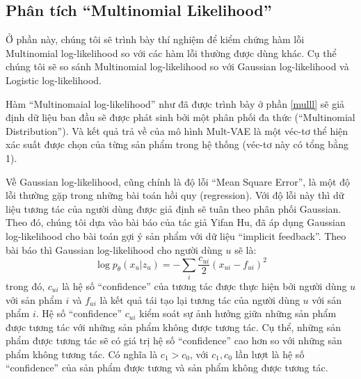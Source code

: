     
    
    \subsection{Phân tích ``Multinomial Likelihood''}

    Ở phần này, chúng tôi sẽ trình bày thí nghiệm để kiểm chứng hàm lỗi Multinomial log-likelihood so với các hàm lỗi thường được dùng khác.
    Cụ thể chúng tôi sẽ so sánh Multinomial log-likelihood so với Gaussian log-likelihood và Logistic log-likelihood. 


    Hàm ``Multinomaial log-likelihood'' như đã được trình bày ở phần \ref{mulll} sẽ giả định dữ liệu ban đầu sẽ được phát sinh bởi một phân phối đa thức (``Multinomial Distribution'').
    Và kết quả trả về của mô hình Mult-VAE là một véc-tơ thể hiện xác suất được chọn của từng sản phẩm trong hệ thống (véc-tơ này có tổng bằng 1).
    
    Về Gaussian log-likelihood, cũng chính là độ lỗi ``Mean Square Error'', là một độ lỗi thường gặp trong những bài toán hồi quy (regression). 
    Với độ lỗi này thì dữ liệu tương tác của người dùng được giả định sẽ tuân theo phân phối Gaussian. 
    Theo đó, chúng tôi dựa vào bài báo \cite{yifan_cf} của tác giả Yifan Hu, đã áp dụng Gaussian log-likelihood cho bài toán gợi ý sản phẩm với dữ liệu ``implicit feedback''. 
    Theo bài báo thì Gaussian log-likelihood cho người dùng $u$ sẽ là:
    \begin{equation}
        \log p_\theta(x_u|z_u) = -\sum_i \frac{c_{ui}}{2}(x_{ui} - f_{ui})^2
    \end{equation}
    trong đó, $c_{ui}$ là hệ số ``confidence'' của tương tác được thực hiện bởi người dùng $u$ với sản phẩm $i$ và $f_{ui}$ là kết quả tái tạo lại tương tác của người dùng $u$ với sản phẩm $i$.
    Hệ số ``confidence'' $c_{ui}$ kiểm soát sự ảnh hưởng giữa những sản phẩm được tương tác với những sản phẩm không được tương tác.
    Cụ thể, những sản phẩm được tương tác sẽ có giá trị hệ số ``confidence'' cao hơn so với những sản phẩm không tương tác.
    Có nghĩa là $c_{1}  > c_0$, với $c_1,c_0$ lần lượt là hệ số ``confidence'' của sản phẩm được tương và sản phẩm không được tương tác. 
    
